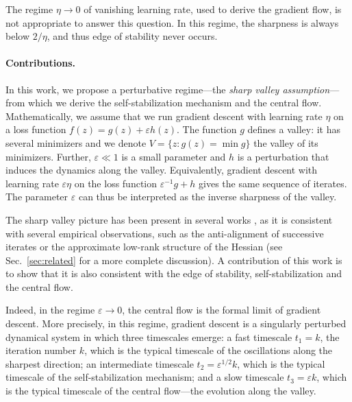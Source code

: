 \documentclass[11pt,english,reqno]{article}
\theoremstyle{plain}
\theoremstyle{definition}
\theoremstyle{remark}
\numberwithin{equation}{section}
\begin{document}
The regime $\eta\to0$ of vanishing learning rate, used to derive the gradient flow, is not appropriate to answer this question. In this regime, the sharpness is always below $2/\eta$, and thus edge of stability never occurs. 

\paragraph{Contributions.} In this work, we propose a perturbative regime---the \emph{sharp valley assumption}---from which we derive the self-stabilization mechanism and the central flow. Mathematically, we assume that we run gradient descent with learning rate $\eta$ on a loss function $f(z) = g(z) + \varepsilon h(z)$. The function $g$ defines a valley: it has several minimizers and we denote $V = \{z : g(z) = \min g\}$ the valley of its minimizers. Further, $\varepsilon \ll 1$ is a small parameter and $h$ is a perturbation that induces the dynamics along the valley. Equivalently, gradient descent 
with learning rate $\varepsilon \eta$ on the loss function $\varepsilon^{-1} g + h$ gives the same sequence of iterates. The parameter $\varepsilon$ can thus be interpreted as the inverse sharpness of the valley. 

The sharp valley picture has been present in several works \cite{xing2018walk, jastrzkebski2018relation, wen2024understanding,liu2025focus, liu2025neural,song2025does}, as it is consistent with several empirical observations, such as the anti-alignment of successive iterates or the approximate low-rank structure of the Hessian (see Sec.~\ref{sec:related} for a more complete discussion). A contribution of this work is to show that it is also consistent with the edge of stability, self-stabilization and the central flow.

Indeed, in the regime $\varepsilon \to 0$, the central flow is the formal limit of gradient descent. More precisely, in this regime, gradient descent is a singularly perturbed dynamical system in which three timescales emerge: a fast timescale $t_1 = k$, the iteration number $k$, which is the typical timescale of the oscillations along the sharpest direction; an intermediate timescale $t_2 = \varepsilon^{1/2} k$, which is the typical timescale of the self-stabilization mechanism; and a slow timescale $t_3 = \varepsilon k$, which is the typical timescale of the central flow---the evolution along the valley. 
\end{document}

